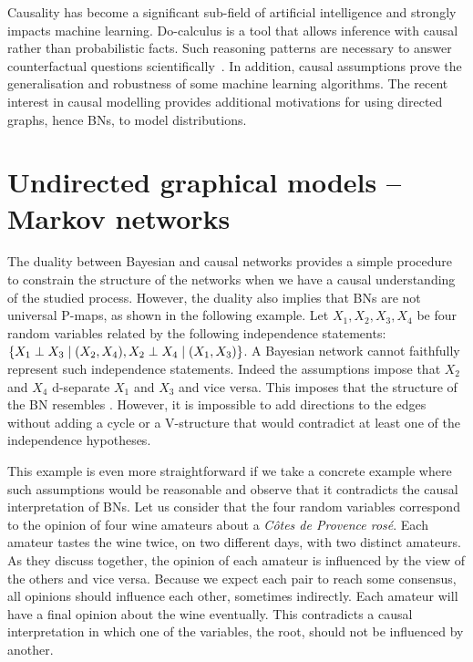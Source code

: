 Causality has become a significant sub-field of artificial intelligence and strongly impacts machine learning. Do-calculus \citep{pearl1994probabilistic} is a tool that allows inference with causal rather than probabilistic facts. Such reasoning patterns are necessary to answer counterfactual questions scientifically~\citep{morgan2015counterfactuals}. In addition, causal assumptions prove the generalisation and robustness of some machine learning algorithms. The recent interest in causal modelling provides additional motivations for using directed graphs, hence BNs, to model distributions.
\section{Undirected graphical models -- Markov networks}
The duality between Bayesian and causal networks provides a simple procedure to constrain the structure of the networks when we have a causal understanding of the studied process. However, the duality also implies that BNs are not universal P-maps, as shown in the following example. Let $X_1, X_2, X_3, X_4$ be four random variables related by the following independence statements: $\{ X_1 \perp X_3 \mid (X_2, X_4), X_2 \perp X_4 \mid (X_1, X_3)\}$. A Bayesian network cannot faithfully represent such independence statements. Indeed the assumptions impose that $X_2$ and $X_4$ d-separate $X_1$ and $X_3$ and vice versa. This imposes that the structure of the BN resembles . However, it is impossible to add directions to the edges without adding a cycle or a V-structure that would contradict at least one of the independence hypotheses.

This example is even more straightforward if we take a concrete example where such assumptions would be reasonable and observe that it contradicts the causal interpretation of BNs. Let us consider that the four random variables correspond to the opinion of four wine amateurs about a \textit{C{\^o}tes de Provence ros{\'e}}. Each amateur tastes the wine twice, on two different days, with two distinct amateurs. As they discuss together, the opinion of each amateur is influenced by the view of the others and vice versa. Because we expect each pair to reach some consensus, all opinions should influence each other, sometimes indirectly.  Each amateur will have a final opinion about the wine eventually. This contradicts a causal interpretation in which one of the variables, the root, should not be influenced by another.

